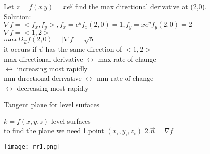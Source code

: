 \begin{example}
Let $z = f(x.y) = xe^{y}$ find the max directional derivative at (2,0).\\
{\color{smalt(darkpowderblue)}\underline{Solution:}}\\
$\nabla f = <f_x ,f_y> , f_x = e^{y} f_x(2,0) = 1 , f_y = xe^{y} f_y (2,0) = 2$\\
$\nabla f = <1,2>$\\
$max D_{\overrightarrow{u}} f(2,0) = |\nabla f| = \surd 5$\\
it occurs if ${\overrightarrow{u}}$ has the same direction of $<1,2>$\\
max directional derivative $\leftrightarrow$ max rate of change \\
                           $\leftrightarrow$ increasing most rapidly \\
min directional derivative $\leftrightarrow$ min rate of change\\
                           $\leftrightarrow$ decreasing most rapidly

\end{example} 
\noindent{\color{smalt(darkpowderblue)}\rule{\linewidth}{.2mm}}
\underline{\color{smalt(darkpowderblue)}Tangent plane for level surfaces}\\
\noindent\begin{minipage}{0.5\textwidth}
$k = f(x,y,z)$ level surfaces\\
to find the plane we need 
    1.point $(x_\circ , y_\circ , z_\circ)$
    2.${\overrightarrow{n}} = \nabla f$\\
\end{minipage}
\noindent\begin{minipage}{0.5\textwidth}
\begin{center}
   \texttt{[image: rr1.png]}\\
\end{center}\end{minipage}
\noindent{\color{smalt(darkpowderblue)}\rule{\linewidth}{.2mm}}

